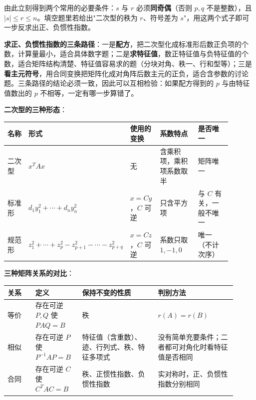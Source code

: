 \documentclass[11pt,openany,UTF8]{ctexbook}
\begin{document}
由此立刻得到两个常用的必要条件：$s$ 与 $r$ 必须\textbf{同奇偶}（否则 $p,q$ 不是整数），且 $\vert s\vert\leq r\leq n$。填空题里若给出"二次型的秩为 $r$、符号差为 $s$"，用这两个式子即可一步反求出正、负惯性指数。

\textbf{求正、负惯性指数的三条路径}：一是\textbf{配方}，把二次型化成标准形后数正负项的个数，计算量最小，适合具体数字题；二是\textbf{求特征值}，数正特征值与负特征值的个数，适合矩阵结构清楚、特征值容易求的题（分块对角、秩一、行和型等）；三是\textbf{看主元符号}，用合同变换把矩阵化成对角阵后数主元的正负，适合含参数的讨论题。三条路径的结论必须一致，因此可以互相检验：如果配方得到的 $p$ 与由特征值数出的 $p$ 不相等，一定有哪一步算错了。

\textbf{二次型的三种形态}：

\begingroup\small\setlength{\tabcolsep}{4.0pt}
\begin{longtable}{@{}L{0.1416\linewidth}L{0.1416\linewidth}L{0.1416\linewidth}L{0.2302\linewidth}L{0.2390\linewidth}@{}}
\toprule
\textbf{名称} & \textbf{形式} & \textbf{使用的变换} & \textbf{系数特点} & \textbf{是否唯一} \\
\midrule
\endhead
二次型 & $x^TAx$ & 无 & 含乘积项，乘积项系数取半 & 矩阵唯一 \\
标准形 & $d_1y_1^2+\cdots+d_ny_n^2$ & $x=Cy$，$C$ 可逆 & 只含平方项 & 与 $C$ 有关，一般不唯一 \\
规范形 & $z_1^2+\cdots+z_p^2-z_{p+1}^2-\cdots-z_{p+q}^2$ & $x=Cz$，$C$ 可逆 & 系数只取 $1,-1,0$ & 唯一（不计次序） \\
\bottomrule
\end{longtable}
\endgroup

\textbf{三种矩阵关系的对比}：

\begingroup\small\setlength{\tabcolsep}{4.0pt}
\begin{longtable}{@{}L{0.1122\linewidth}L{0.1823\linewidth}L{0.3014\linewidth}L{0.3155\linewidth}@{}}
\toprule
\textbf{关系} & \textbf{定义} & \textbf{保持不变的性质} & \textbf{判别方法} \\
\midrule
\endhead
等价 & 存在可逆 $P,Q$ 使 $PAQ=B$ & 秩 & $r(A)=r(B)$ \\
相似 & 存在可逆 $P$ 使 $P^{-1}AP=B$ & 特征值（含重数）、迹、行列式、秩、特征多项式 & 没有简单充要条件；二者都可对角化时看特征值是否相同 \\
合同 & 存在可逆 $C$ 使 $C^TAC=B$ & 秩、正惯性指数、负惯性指数 & 实对称时，正、负惯性指数分别相同 \\
\bottomrule
\end{longtable}
\endgroup
\end{document}
